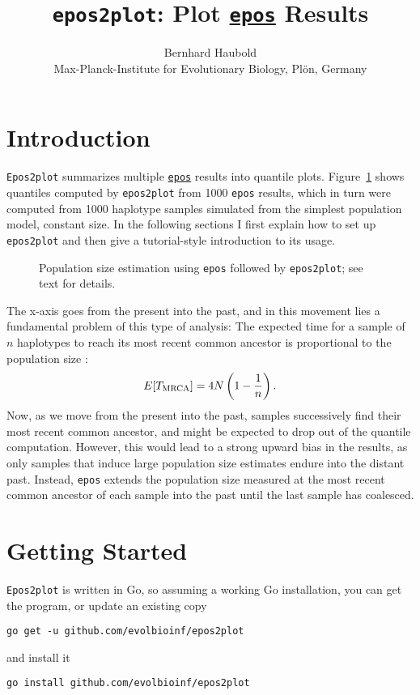 \documentclass[a4paper]{article}
\newcommand{\ty}{\texttt}
\begin{document}
\title{\ty{epos2plot}: Plot \href{http://github.com/evolbioinf/epos}{\ty{epos}} Results}
\author{Bernhard Haubold\\\small Max-Planck-Institute for Evolutionary Biology, Pl\"on, Germany}
\maketitle
\section{Introduction}
\ty{Epos2plot} summarizes multiple
\href{http://github.com/evolbioinf/epos}{\ty{epos}} results into
quantile plots. Figure~\ref{fig:qua} shows quantiles
computed by \ty{epos2plot} from 1000 \ty{epos} results, which in turn
were computed from 1000 haplotype samples simulated
from the simplest population model, constant size. In the following
sections I first explain how to set up \ty{epos2plot} and then give a
tutorial-style introduction to its usage.

\begin{figure}
  \begin{center}
    \scalebox{0.6}{}
  \end{center}
  \caption{Population size estimation using \ty{epos} followed by
    \ty{epos2plot}; see text for details.}\label{fig:qua}
\end{figure}


The x-axis goes from the
present into the past, and in this movement lies a fundamental problem
of this type of analysis: The expected time for a sample of $n$
haplotypes to reach its most recent common ancestor is proportional to
the population size \cite[p. 76]{wak09:coa}:
\[
E[T_{\rm MRCA}]=4N\left(1-\frac{1}{n}\right).
\]
Now, as we move from the present into the past, samples successively
find their most recent common ancestor, and might be expected to drop
out of the quantile computation. However, this would lead to a strong
upward bias in the results, as only samples that induce large
population size estimates endure into the distant past. Instead,
\ty{epos} extends the population size measured at the most recent
common ancestor of each sample into the past until the last sample has
coalesced.


\section{Getting Started}
\ty{Epos2plot} is written in Go, so assuming a working Go
installation, you can get the program, or update an existing copy
\begin{verbatim}
go get -u github.com/evolbioinf/epos2plot
\end{verbatim}
and install it
\begin{verbatim}
go install github.com/evolbioinf/epos2plot
\end{verbatim}
\end{document}
